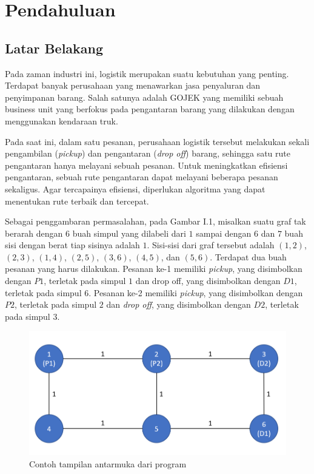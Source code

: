 \chapter{Pendahuluan}

\section{Latar Belakang}

Pada zaman industri ini, logistik merupakan suatu kebutuhan yang penting. Terdapat banyak 
perusahaan yang menawarkan jasa penyaluran dan penyimpanan barang. Salah satunya adalah 
GOJEK yang memiliki sebuah business unit yang berfokus pada pengantaran barang yang 
dilakukan dengan menggunakan kendaraan truk.

Pada saat ini, dalam satu pesanan, perusahaan logistik tersebut melakukan sekali pengambilan 
(\textit{pickup}) dan pengantaran (\textit{drop off}) barang, sehingga satu rute pengantaran 
hanya melayani sebuah pesanan. Untuk meningkatkan efisiensi pengantaran, sebuah rute 
pengantaran dapat melayani beberapa pesanan sekaligus. Agar tercapainya efisiensi, 
diperlukan algoritma yang dapat menentukan rute terbaik dan tercepat.

Sebagai penggambaran permasalahan, pada Gambar I.1, misalkan suatu graf tak berarah dengan 
$6$ buah simpul yang dilabeli dari $1$ sampai dengan $6$ dan $7$ buah sisi dengan berat 
tiap sisinya adalah $1$. Sisi-sisi dari graf tersebut adalah $(1,2)$, $(2,3)$, $(1,4)$, 
$(2,5)$, $(3,6)$, $(4,5)$, dan $(5,6)$. Terdapat dua buah pesanan yang harus dilakukan. 
Pesanan ke-1 memiliki \textit{pickup}, yang disimbolkan dengan $P1$, terletak pada simpul 
$1$ dan drop off, yang disimbolkan dengan $D1$, terletak pada simpul $6$. Pesanan ke-2 
memiliki \textit{pickup}, yang disimbolkan dengan $P2$, terletak pada simpul $2$ dan 
\textit{drop off}, yang disimbolkan dengan $D2$, terletak pada simpul $3$.

\begin{figure}[H]
    \centering
    \includegraphics[width=1.0\textwidth]{resources/graph_init.png}
    \caption{Contoh tampilan antarmuka dari program}
\end{figure}


